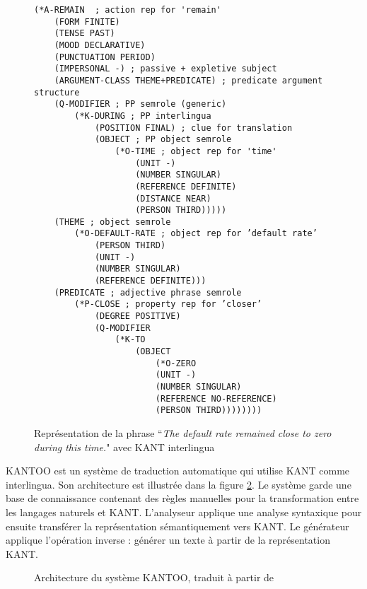 \documentclass{KodeBook}
\begin{document}
\begin{figure}[!ht]
	\centering
\begin{multicols}{2}
\bfseries\tiny
\begin{verbatim}
(*A-REMAIN  ; action rep for 'remain'
    (FORM FINITE)
    (TENSE PAST)
    (MOOD DECLARATIVE)
    (PUNCTUATION PERIOD)
    (IMPERSONAL -) ; passive + expletive subject
    (ARGUMENT-CLASS THEME+PREDICATE) ; predicate argument structure
    (Q-MODIFIER ; PP semrole (generic)
        (*K-DURING ; PP interlingua
            (POSITION FINAL) ; clue for translation
 		    (OBJECT ; PP object semrole
 		        (*O-TIME ; object rep for 'time'
 		            (UNIT -)
 		            (NUMBER SINGULAR)
 		            (REFERENCE DEFINITE)
 		            (DISTANCE NEAR)
 		            (PERSON THIRD)))))
    (THEME ; object semrole
        (*O-DEFAULT-RATE ; object rep for ’default rate’
            (PERSON THIRD)
            (UNIT -)
            (NUMBER SINGULAR)
            (REFERENCE DEFINITE)))
    (PREDICATE ; adjective phrase semrole
        (*P-CLOSE ; property rep for ’closer’
            (DEGREE POSITIVE)
            (Q-MODIFIER
                (*K-TO
                    (OBJECT
                        (*O-ZERO
                        (UNIT -)
                        (NUMBER SINGULAR)
                        (REFERENCE NO-REFERENCE)
                        (PERSON THIRD))))))))
\end{verbatim}
\end{multicols}
	\caption[Exemple de la représentation KANT]{Représentation de la phrase ``\textit{The default rate remained close to zero during this time.}" avec KANT interlingua \cite{98-czuba-al}}
	\label{fig:kant-exp}
\end{figure}

KANTOO \cite{00-nyberg-al} est un système de traduction automatique qui utilise KANT comme interlingua.
Son architecture est illustrée dans la figure \ref{fig:mt-kantoo-arch}.
Le système garde une base de connaissance contenant des règles manuelles pour la transformation entre les langages naturels et KANT. 
L'analyseur applique une analyse syntaxique pour ensuite transférer la représentation sémantiquement vers KANT. 
Le générateur applique l'opération inverse : générer un texte à partir de la représentation KANT.

\begin{figure}[!ht]
	\centering
	\caption[Architecture du système KANTOO]{Architecture du système KANTOO, traduit à partir de \cite{00-nyberg-al}}
	\label{fig:mt-kantoo-arch}
\end{figure}
\end{document}
